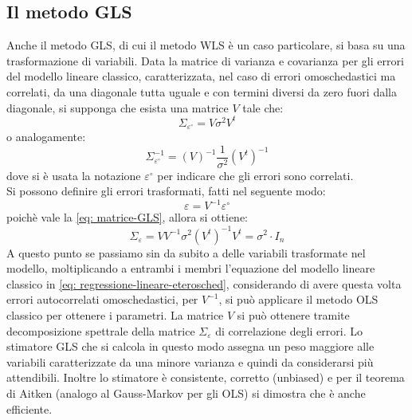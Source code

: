 \subsection{Il metodo GLS}
Anche il metodo GLS, di cui il metodo WLS è un caso particolare, si basa su una trasformazione di variabili.
Data la matrice di varianza e covarianza per gli errori del modello lineare classico, caratterizzata, nel caso di errori omoschedastici ma correlati, da una diagonale tutta uguale e con termini diversi da zero fuori dalla diagonale, si supponga che esista una matrice $V$ tale che:
\begin{equation}
\Sigma_{\varepsilon^\circ} = V \sigma^2 V^t
\label{eq: matrice-GLS}
\end{equation}
o analogamente:
\begin{equation}
\Sigma_{\varepsilon^\circ}^{-1} = (V)^{-1} \frac{1}{\sigma^2} (V^t)^{-1}
\end{equation}
dove si è usata la notazione $\varepsilon^\circ$ per indicare che gli errori sono correlati.\\
Si possono definire gli errori trasformati, fatti nel seguente modo:
\begin{equation}
\varepsilon = V^{-1} \varepsilon^\circ
\end{equation}
poichè vale la \eqref{eq: matrice-GLS}, allora si ottiene:
\begin{equation}
\Sigma_\varepsilon = VV^{-1} \sigma^2 (V^t)^{-1}V^t = \sigma^2 \cdot I_n
\end{equation}
A questo punto se passiamo sin da subito a delle variabili trasformate nel modello, moltiplicando a entrambi i membri l'equazione del modello lineare classico in \eqref{eq: regressione-lineare-eterosched}, considerando di avere questa volta errori autocorrelati omoschedastici, per $V^{-1}$, si può applicare il metodo OLS classico per ottenere i parametri.
La matrice $V$ si può ottenere tramite decomposizione spettrale della matrice $\Sigma_\varepsilon$ di correlazione degli errori.
Lo stimatore GLS che si calcola in questo modo assegna un peso maggiore alle variabili caratterizzate da una minore varianza e quindi da considerarsi più attendibili. Inoltre lo stimatore è consistente, corretto (unbiased) e per il teorema di Aitken (analogo al Gauss-Markov per gli OLS) si dimostra che è anche efficiente.
